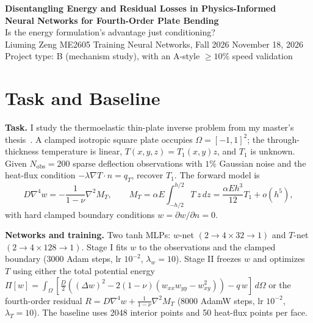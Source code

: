 \documentclass[10pt]{article}
\begin{document}
\begin{center}
{\large\bfseries Disentangling Energy and Residual Losses in Physics-Informed\\[1pt]
Neural Networks for Fourth-Order Plate Bending}\\[2pt]
{\normalsize Is the energy formulation's advantage just conditioning?}\\[2pt]
{\small Liuming Zeng \quad ME2605 Training Neural Networks, Fall 2026 \quad November 18, 2026}\\[1pt]
{\small Project type: B (mechanism study), with an A-style $\ge10\%$ speed validation}
\end{center}
\vspace{-6pt}

\section{Task and Baseline}

\textbf{Task.} I study the thermoelastic thin-plate inverse problem from my master's thesis~\cite{zeng2026}. A clamped isotropic square plate occupies $\Omega=[-1,1]^2$; the through-thickness temperature is linear, $T(x,y,z)=T_1(x,y)z$, and $T_1$ is unknown. Given $N_{\mathrm{obs}}=200$ sparse deflection observations with $1\%$ Gaussian noise and the heat-flux condition $-\lambda\nabla T\cdot n=q_T$, recover $T_1$. The forward model is
\begin{equation}
D\nabla^4 w=-\frac{1}{1-\nu}\nabla^2 M_T,\qquad
M_T=\alpha E\!\int_{-h/2}^{h/2}T\,z\,dz=\frac{\alpha E h^3}{12}T_1+o(h^5),
\label{eq:plate}
\end{equation}
with hard clamped boundary conditions $w=\partial w/\partial n=0$.

\textbf{Networks and training.} Two tanh MLPs: $w$-net $(2\to4\times32\to1)$ and $T$-net $(2\to4\times128\to1)$. Stage I fits $w$ to the observations and the clamped boundary (3000 Adam steps, lr $10^{-2}$, $\lambda_w=10$). Stage II freezes $w$ and optimizes $T$ using either the total potential energy $\Pi[w]=\int_\Omega[\tfrac{D}{2}((\Delta w)^2-2(1-\nu)(w_{xx}w_{yy}-w_{xy}^2))-q\,w]\,d\Omega$ or the fourth-order residual $R=D\nabla^4w+\tfrac{1}{1-\nu}\nabla^2M_T$ (8000 AdamW steps, lr $10^{-2}$, $\lambda_T=10$). The baseline uses 2048 interior points and 50 heat-flux points per face.
\end{document}

